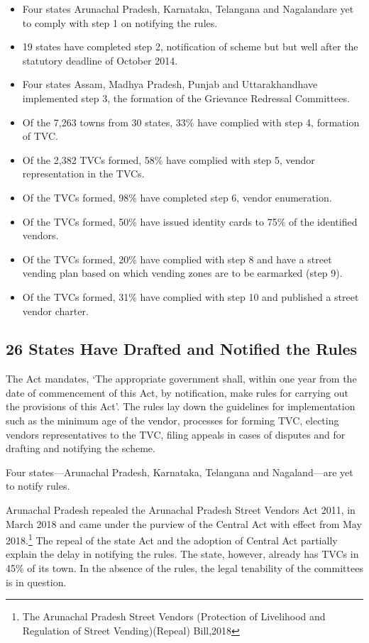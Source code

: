 \documentclass[a4paper, 12pt, twoside]{article}
\begin{document}
{\begin{itemize}
	\item Four states \textemdash Arunachal Pradesh, Karnataka, Telangana and Nagaland\textemdash are yet to comply with step 1 on notifying the rules.
	\item 19 states have completed step 2, notification of scheme but but well after the statutory deadline of October 2014.
	\item Four states \textemdash  Assam, Madhya Pradesh, Punjab and Uttarakhand\textemdash have implemented step 3, the formation of the Grievance Redressal Committees.
	\item Of the 7,263 towns from 30 states, 33\% have complied with step 4, formation of TVC.
	\item Of the 2,382 TVCs formed, 58\% have complied with step 5, vendor representation in the TVCs.
	\item Of the TVCs formed, 98\% have completed step 6, vendor enumeration.
	\item Of the TVCs formed, 50\% have issued identity cards to 75\% of the identified vendors.
	\item Of the TVCs formed, 20\% have complied with step 8 and have a street vending plan based on which vending zones are to be earmarked (step 9). 
	\item Of the TVCs formed, 31\% have complied with step 10 and published a street vendor charter.
\end{itemize}

\subsection*{26 States Have Drafted and Notified the Rules}
	The Act mandates, `The appropriate government shall, within one year from the date of commencement of this Act, by notification, make rules for carrying out the provisions of this Act'. The rules lay down the guidelines for implementation such as the minimum age of the vendor, processes for forming TVC, electing vendors representatives to the TVC, filing appeals in cases of disputes and for drafting and notifying the scheme.

	Four states—Arunachal Pradesh, Karnataka, Telangana and Nagaland—are yet to notify rules.

	Arunachal Pradesh repealed the Arunachal Pradesh Street Vendors Act 2011, in March 2018 and came under the purview of the Central Act with effect from May 2018.\footnote{The Arunachal Pradesh Street Vendors (Protection of Livelihood and Regulation of Street Vending)(Repeal) Bill,2018} The repeal of the state Act and the adoption of Central Act partially explain the delay in notifying the rules. The state, however, already has TVCs in 45\% of its town. In the absence of the rules, the legal tenability of the committees is in question.

}
\end{document}
